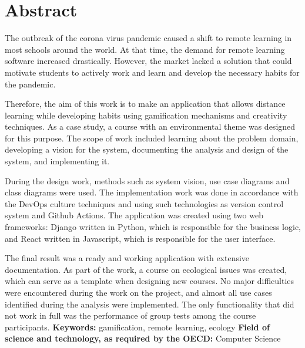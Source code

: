 \chapter*{Abstract}
\indent The outbreak of the corona virus pandemic caused a shift to remote learning in most schools around the world. At that time, the demand for remote learning software increased drastically. However, the market lacked a solution that could motivate students to actively work and learn and develop the necessary habits for the pandemic. 

Therefore, the aim of this work is to make an application that allows distance learning while developing habits using gamification mechanisms and creativity techniques. As a case study, a course with an environmental theme was designed for this purpose. The scope of work included learning about the problem domain, developing a vision for the system, documenting the analysis and design of the system, and implementing it. 

During the design work, methods such as system vision, use case diagrams and class diagrams were used. The implementation work was done in accordance with the DevOps culture techniques and using such technologies as version control system and Github Actions. The application was created using two web frameworks: Django written in Python, which is responsible for the business logic, and React written in Javascript, which is responsible for the user interface.  

The final result was a ready and working application with extensive documentation. As part of the work, a course on ecological issues was created, which can serve as a template when designing new courses. No major difficulties were encountered during the work on the project, and almost all use cases identified during the analysis were implemented. The only functionality that did not work in full was the performance of group tests among the course participants. 
\vspace{0.5cm}\newline
\noindent \textbf{Keywords:} gamification, remote learning, ecology 
\vspace{0.5cm}\newline
\noindent \textbf{Field of science and technology, as required by the OECD: } Computer Science